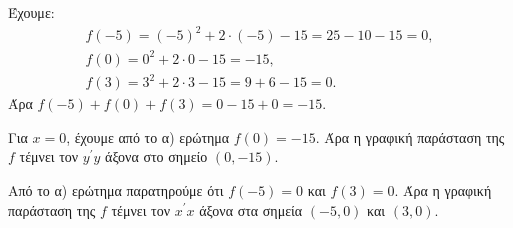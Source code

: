 
\begin{alist}
\item Έχουμε:
\begin{gather*}
f(-5) = (-5)^2 + 2 \cdot (-5) - 15 = 25 - 10 - 15 = 0, \\
f(0) = 0^2 + 2 \cdot 0 - 15 = -15, \\
f(3) = 3^2 + 2 \cdot 3 - 15 = 9 + 6 - 15 = 0.
\end{gather*}
Άρα $f(-5) + f(0) + f(3) = 0 - 15 + 0 = -15$.

\item Για $x = 0$, έχουμε από το α) ερώτημα $f(0) = -15$. Άρα η γραφική παράσταση της $f$ τέμνει τον $y^\prime y$ άξονα στο σημείο $(0, -15)$.

Από το α) ερώτημα παρατηρούμε ότι $f(-5) = 0$ και $f(3) = 0$. Άρα η γραφική παράσταση της $f$ τέμνει τον $x^\prime x$ άξονα στα σημεία $(-5, 0)$ και $(3, 0)$.
\end{alist}

